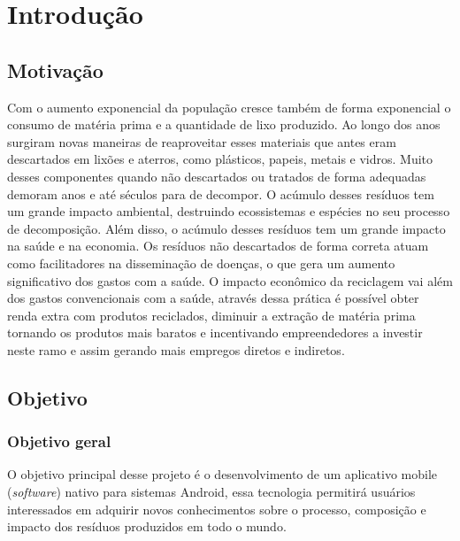 \documentclass[
	12pt,				%
	openright,			%
	twoside,			%
	a4paper,			%
	english,			%
	french,				%
	spanish,			%
	brazil				%
	]{abntex2}
\begin{document}
\tableofcontents*
\cleardoublepage




\textual





\chapter{Introdução}
\section{Motivação}
Com o aumento exponencial da população cresce também de forma exponencial o consumo de matéria prima e a quantidade de lixo produzido. Ao longo dos anos surgiram novas maneiras de reaproveitar esses materiais que antes eram descartados em lixões e aterros, como plásticos, papeis, metais e vidros. Muito desses componentes quando não descartados ou tratados de forma adequadas demoram anos e até séculos para de decompor. O acúmulo desses resíduos tem um grande impacto ambiental, destruindo ecossistemas e espécies no seu processo de decomposição. Além disso, o acúmulo desses resíduos tem um grande impacto na saúde e na economia. Os resíduos não descartados de forma correta atuam como facilitadores na disseminação de doenças, o que gera um aumento significativo dos gastos com a saúde. O impacto econômico da reciclagem vai além dos gastos convencionais com a saúde, através dessa prática é possível obter renda extra com produtos reciclados, diminuir a extração de matéria prima tornando os produtos mais baratos e incentivando empreendedores a investir neste ramo e assim gerando mais empregos diretos e indiretos. 
\section{Objetivo}
\subsection{Objetivo geral}
O objetivo principal desse projeto é o desenvolvimento de um aplicativo mobile (\textit{software}) nativo para sistemas Android, essa tecnologia permitirá usuários interessados em adquirir novos conhecimentos sobre o processo, composição e impacto dos resíduos produzidos em todo o mundo.
\end{document}
